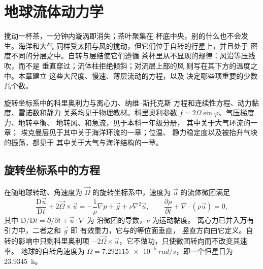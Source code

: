 \chapter{地球流体动力学}\label{ch:b3:gfd-foundations}

搅动一杯茶，一分钟内漩涡即消失；茶叶聚集在
杯底中央，别的什么也不会发生。海洋和大气
同样受太阳与风的搅动，但它们位于自转的行星上，并且处于
密度不同的分层之中。自转与层结使它们遵循
茶杯里从不显现的规律：风沿等压线吹，而不是
垂直穿过；流体柱拒绝倾斜；对流层上部的风
则写在其下方的温度之中。本章建立
这些大尺度、慢速、薄层流动的方程，以及
决定哪些项重要的少数几个数。

\begin{recall}
旋转坐标系中的科里奥利力与离心力、纳维–斯托克斯
方程和连续性方程、动力黏度、雷诺数和静力
关系均见于物理教材。科里奥利参数 $f = 2\Omega
\sin\varphi$、气压梯度力、地转平衡、
地转风、和急流，见于本科一年级分册，
其中关于大气环流的一章；
埃克曼层见于其中关于海洋环流的一章；位温、
静力稳定度以及被抬升气块的振荡，都见于
其中关于大气与海洋结构的一章。
\end{recall}

\section{旋转坐标系中的方程}\label{sec:b3:gfd-foundations:equations}

在随地球转动、角速度为
$\vec\Omega$ 的旋转坐标系中，速度为 $\vec u$ 的流体微团满足
\[
\frac{\mathrm D\vec u}{\mathrm Dt} + 2\vec\Omega\times\vec u =
-\frac{1}{\rho}\nabla p + \vec g + \nu\nabla^2\vec u ,
\qquad
\frac{\partial\rho}{\partial t} + \nabla\cdot(\rho\vec u) = 0 ,
\]
其中 $\mathrm D/\mathrm Dt = \partial/\partial t + \vec u\cdot\nabla$ 为
沿微团的导数，$\nu$ 为运动黏度。
离心力已并入万有引力中，二者之和 $\vec g$ 即
有效重力，它与的等位面垂直，
竖直方向由它定义。自转的影响中只剩科里奥利项 $-2\vec\Omega\times
\vec u$，它不做功，只使微团转向而不改变其速率。
地球的自转角速度为 $\Omega =
\qty{7.292115e-5}{rad/s}$，即一个恒星日为 \qty{23.9345}{h}。

